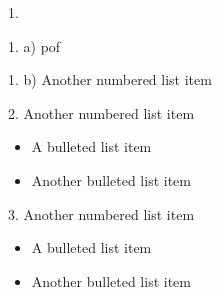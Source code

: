 \documentclass{article}
\begin{document}
1.  



1. a)  pof


1. b)  Another numbered list item




2.  Another numbered list item

\begin{itemize}
\item A bulleted list item
\item Another bulleted list item
\end{itemize}



3.  Another numbered list item




\begin{itemize}
\item A bulleted list item
\item Another bulleted list item
\end{itemize}
\end{document}

